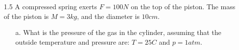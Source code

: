 \documentclass[10pt, a4paper]{article}
\begin{document}
\begin{enumerate}
  \item[1.5] A compressed spring exerts $F=100N$ on the top of the piston. The mass of the piston is $M=3kg$, and the diameter is
    $10 cm$.
    \begin{enumerate}
      \item[a.] What is the pressure of the gas in the cylinder, assuming that the outside temperature and pressure are:
        $T=25C$ and $p=1atm$.

    \end{enumerate}

\end{enumerate}
\end{document}
